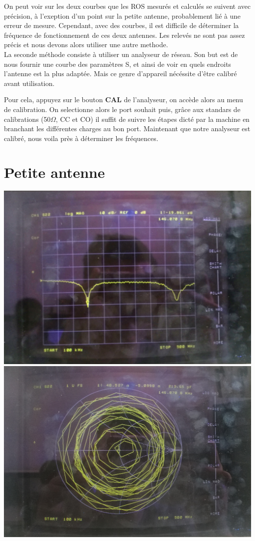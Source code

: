 \documentclass[a4paper,12pt]{report}            %
\begin{document}
On peut voir sur les deux courbes que les ROS mesurés et calculés se suivent avec précision, à l'exeption
d'un point sur la petite antenne, probablement lié à une erreur de mesure. Cependant, avec des courbes, il
est difficile de déterminer la fréquence de fonctionnement de ces deux antennes. Les relevés ne sont pas assez 
précis et nous devons alors utiliser une autre methode.\\
La seconde méthode consiste à utiliser un analyseur de réseau. Son but est de nous fournir une courbe des
paramètres S, et ainsi de voir en quels endroits l'antenne est la plus adaptée. Mais ce genre d'appareil nécéssite 
d'être calibré avant utilisation.

Pour cela, appuyez sur le bouton \textbf{CAL} de l'analyseur, on accède alors au menu de calibration. On selectionne
alors le port souhait puis, grâce aux standars de calibrations (50$\Omega$, CC et CO) il suffit de suivre les étapes
dicté par la machine en branchant les différentes charges au bon port. Maintenant que notre analyseur est 
calibré, nous voila près à déterminer les fréquences.

\section{Petite antenne}

\begin{center}
	\includegraphics[scale = 0.072]{pic/S_petite.jpg}
	\includegraphics[scale = 0.06]{pic/Smith_petite.jpg} 
\end{center}
\end{document}
